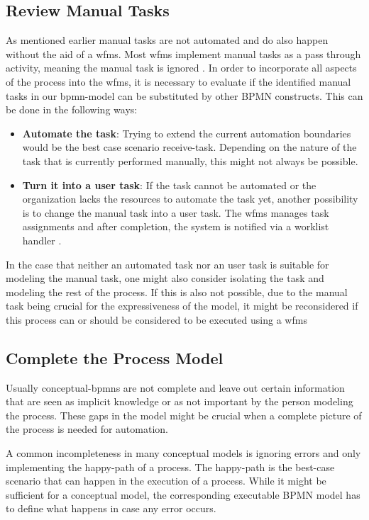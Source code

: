 \subsection{Review Manual Tasks}\label{manual}
As mentioned earlier manual tasks are not automated and do also happen without the aid of a \gls{wfms}. Most \gls{wfms} implement manual tasks as a pass through activity, meaning the manual task is ignored \cite{manual-activity}\cite{manual-camunda}\cite{manual-bizagi}. In order to incorporate all aspects of the process into the \gls{wfms}, it is necessary to evaluate if the identified manual tasks in our \gls{bpmn}-model can be substituted by other BPMN constructs. This can be done in the following ways:
\begin{itemize}
	\item \textbf{Automate the task}: Trying to extend the current automation boundaries would be the best case scenario \gls{receive-task}. Depending on the nature of the task that is currently performed manually, this might not always be possible. 
	
	\item \textbf{Turn it into a user task}: If the task cannot be automated or the organization lacks the resources to automate the task yet, another possibility is to change the manual task into a user task. The \gls{wfms} manages task assignments and after completion, the system is notified via a worklist handler . \cite{stefanov2014business}
\end{itemize}

In the case that neither an automated task nor an user task is suitable for modeling the manual task, one might also consider isolating the task and modeling the rest of the process. If this is also not possible, due to the manual task being crucial for the expressiveness of the model, it might be reconsidered if this process can or should be considered to be executed using a \gls{wfms}\cite[p.~228]{freund2019real}

\subsection{Complete the Process Model}\label{complete}
Usually \gls{conceptual-bpmn}s are not complete and leave out certain information that are seen as implicit knowledge or as not important by the person modeling the process. These gaps in the model might be crucial when a complete picture of the process is needed for automation. 

A common incompleteness in many conceptual models is ignoring errors and only implementing the \gls{happy-path} of a process. The \gls{happy-path} is the best-case scenario that can happen in the execution of a process. While it might be sufficient for a conceptual model, the corresponding executable BPMN model has to define what happens in case any error occurs. 

